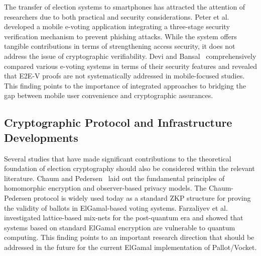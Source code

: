 \documentclass[a4paper,fleqn]{cas-sc}
\begin{document}
The transfer of election systems to smartphones has attracted the attention of researchers due to both practical and security considerations. Peter et al.~\cite{Peter2022} developed a mobile e-voting application integrating a three-stage security verification mechanism to prevent phishing attacks. While the system offers tangible contributions in terms of strengthening access security, it does not address the issue of cryptographic verifiability. Devi and Bansal~\cite{Devi2023} comprehensively compared various e-voting systems in terms of their security features and revealed that E2E-V proofs are not systematically addressed in mobile-focused studies. This finding points to the importance of integrated approaches to bridging the gap between mobile user convenience and cryptographic assurances.

\subsection{Cryptographic Protocol and Infrastructure Developments}


Several studies that have made significant contributions to the theoretical foundation of election cryptography should also be considered within the relevant literature. Chaum and Pedersen~\cite{Chaum1992} laid out the fundamental principles of homomorphic encryption and observer-based privacy models. The Chaum-Pedersen protocol is widely used today as a standard ZKP structure for proving the validity of ballots in ElGamal-based voting systems. Farzaliyev et al.~\cite{Farzaliyev2023} investigated lattice-based mix-nets for the post-quantum era and showed that systems based on standard ElGamal encryption are vulnerable to quantum computing. This finding points to an important research direction that should be addressed in the future for the current ElGamal implementation of Pallot/Vocket.
\end{document}

